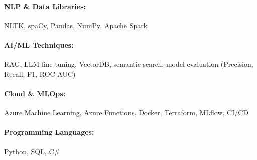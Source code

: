 \documentclass[10pt, letterpaper]{article}
\newenvironment{highlights}{
    \begin{itemize}[
        topsep=0.10 cm,
        parsep=0.10 cm,
        partopsep=0pt,
        itemsep=0pt,
        leftmargin=0 cm + 10pt
    ]
}{
    \end{itemize}
} %
\newenvironment{onecolentry}{
    \begin{adjustwidth}{
        0 cm + 0.00001 cm
    }{
        0 cm + 0.00001 cm
    }
}{
    \end{adjustwidth}
} %
\begin{document}
        \paragraph{NLP \& Data Libraries:} NLTK, spaCy, Pandas, NumPy, Apache Spark
        \vspace{-4mm}
        \paragraph{AI/ML Techniques:} RAG, LLM fine-tuning, VectorDB, semantic search, model evaluation (Precision, Recall, F1, ROC-AUC)
        \vspace{-4mm}
        \paragraph{Cloud \& MLOps:} Azure Machine Learning, Azure Functions, Docker, Terraform, MLflow, CI/CD
        \vspace{-4mm}
        \paragraph{Programming Languages:} Python, SQL, C\#

    
        

\end{document}
